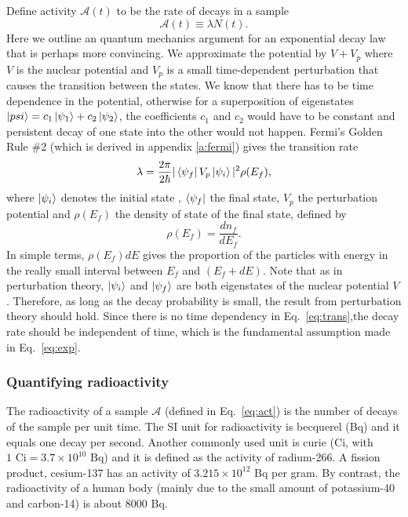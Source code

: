 \documentclass[nofootinbib,preprint,aip,pra]{revtex4-1}
\begin{document}
        Define activity $\mathcal{A}(t)$ to be the rate of decays in a sample
        \begin{equation} \label{eq:act}
            \mathcal{A}(t)\equiv \lambda N(t).
        \end{equation}
        Here we outline an quantum mechanics argument for an exponential decay law that is perhaps more
        convincing.
        We approximate the potential by $V+V_p$ where $V$ is the nuclear potential and $V_p$ is a small
        time-dependent perturbation that causes the transition between the states. We know that there has
        to be time dependence in the potential, otherwise for a superposition of eigenstates
        $\ket{psi}=c_1\ket{\psi_1} + c_2\ket{\psi_2}$, the coefficients $c_1$ and $c_2$ would 
        have to be constant and
        persistent decay of one state into the other would not happen.
        Fermi's Golden Rule \#2 (which is derived in appendix \ref{a:fermi})
        gives the transition rate
        \begin{equation}
            \label{eq:trans}
            \lambda = \frac{2\pi}{2\hbar}|\bra{\psi_f}V_p\ket{\psi_i}|^2\rho(E_f),
        \end{equation}
        where $\ket{\psi_i}$ denotes the initial state , $\bra{\psi_f}$ the final state, $V_p$ the perturbation
        potential and $\rho(E_f)$ the density of state of the final state, defined by
        \begin{equation}
            \rho(E_f) = \frac{dn_f}{dE_f}.
        \end{equation}
        In simple terms, $\rho(E_f)dE$ gives the proportion of the particles with energy in the
        really small interval between
        $E_f$ and $(E_f+dE)$.
        Note that as in perturbation theory, $\ket{\psi_i}$ and
        $\ket{\psi_f}$ are both eigenstates of the nuclear potential $V$. Therefore, as long as
        the decay probability is small, the result from perturbation theory should hold. Since
        there is no time dependency in Eq.~\ref{eq:trans},the
        decay rate should be independent of time, which is the fundamental assumption made in
        Eq.~\ref{eq:exp}.

        \subsubsection{Quantifying radioactivity}
        The radioactivity of a sample $\mathcal{A}$ (defined in Eq.~\ref{eq:act}) 
        is the number of decays of the sample per unit time. The SI
        unit for radioactivity is becquerel (Bq) and it equals one decay per second. Another commonly used
        unit is curie (Ci, with $1\text{ Ci}=3.7\times 10^{10}\text{ Bq}$) and it is defined as
        the activity of radium-266. A fission product, cesium-137 has an activity of $3.215\times 10^{12}$ Bq
        per gram. By contrast, the radioactivity of a human body (mainly due to the small amount of 
        potassium-40 and carbon-14) is about $8000$ Bq.
\end{document}
